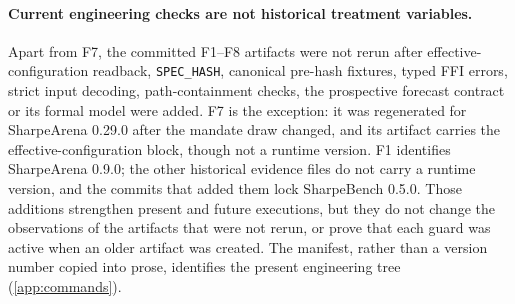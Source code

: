 \paragraph{Current engineering checks are not historical treatment variables.} Apart from F7, the committed F1--F8 artifacts were not rerun after effective-configuration readback, \texttt{SPEC\_HASH}, canonical pre-hash fixtures, typed FFI errors, strict input decoding, path-containment checks, the prospective forecast contract or its formal model were added. F7 is the exception: it was regenerated for SharpeArena 0.29.0 after the mandate draw changed, and its artifact carries the effective-configuration block, though not a runtime version. F1 identifies SharpeArena 0.9.0; the other historical evidence files do not carry a runtime version, and the commits that added them lock SharpeBench 0.5.0. Those additions strengthen present and future executions, but they do not change the observations of the artifacts that were not rerun, or prove that each guard was active when an older artifact was created. The manifest, rather than a version number copied into prose, identifies the present engineering tree (\cref{app:commands}).

